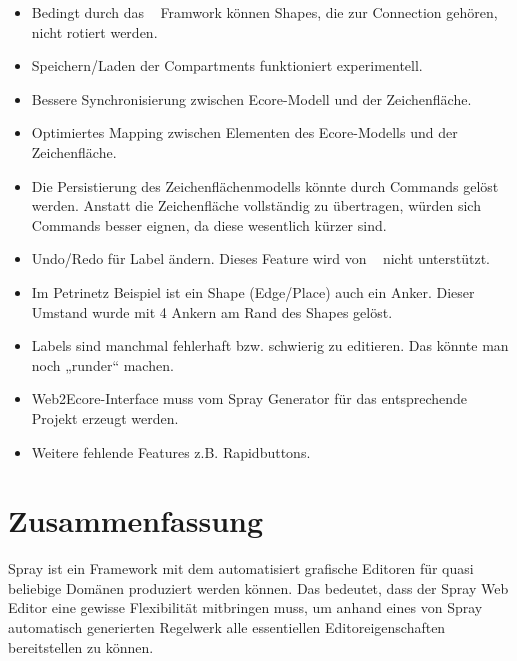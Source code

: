 \begin{itemize}
  \item Bedingt durch das \dd~ Framwork können Shapes, die zur Connection gehören, nicht rotiert werden.
  \item Speichern/Laden der Compartments funktioniert experimentell. 
  \item Bessere Synchronisierung zwischen Ecore-Modell und der Zeichenfläche.
  \item Optimiertes Mapping zwischen Elementen des Ecore-Modells und der Zeichenfläche.
  \item Die Persistierung des Zeichenflächenmodells könnte durch Commands gelöst werden. Anstatt die Zeichenfläche
  vollständig zu übertragen, würden sich Commands besser eignen, da diese wesentlich kürzer sind.
  \item Undo/Redo für Label ändern. Dieses Feature wird von \dd~ nicht unterstützt.
  \item Im Petrinetz Beispiel ist ein Shape (Edge/Place) auch ein Anker. Dieser Umstand wurde mit 4 Ankern am Rand des Shapes gelöst.
  \item Labels sind manchmal fehlerhaft bzw. schwierig zu editieren. Das könnte man noch „runder“ machen.
  \item Web2Ecore-Interface muss vom Spray Generator für das entsprechende Projekt erzeugt werden.
  \item Weitere fehlende Features z.B. Rapidbuttons.
\end{itemize}


\section{Zusammenfassung}

Spray ist ein Framework mit dem automatisiert grafische Editoren für quasi
beliebige Domänen produziert werden können. Das bedeutet, dass der Spray Web Editor
eine gewisse Flexibilität mitbringen muss, um anhand eines von
Spray automatisch generierten Regelwerk alle essentiellen Editoreigenschaften
bereitstellen zu können.

